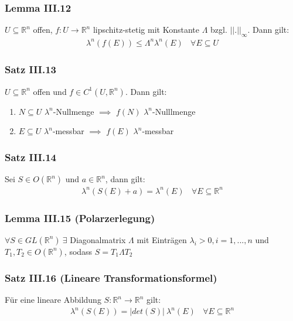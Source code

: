 \begin{frame}
\frametitle{Lemma III.12}
$U \subseteq \mathbb{R}^n$ offen, $f: U \to \mathbb{R}^n$ lipschitz-stetig mit Konstante $\Lambda$ bzgl. $||.||_{\infty}$. Dann gilt:
    \begin{align*}
      \lambda^n(f(E)) \leq \Lambda^n \lambda^n(E) \ \ \ \ \forall E \subseteq U
    \end{align*}
\end{frame}


\begin{frame}
\frametitle{Satz III.13}
$U \subseteq \mathbb{R}^n$ offen und $f \in C^1(U, \mathbb{R}^n)$. Dann gilt:
    \begin{enumerate}[label=\roman*)]
      \item $N \subseteq U$ $\lambda^n$-Nullmenge $\implies$ $f(N)$ $\lambda^n$-Nulllmenge
      \item $E \subseteq U$ $\lambda^n$-messbar $\implies$ $f(E)$ $\lambda^n$-messbar
    \end{enumerate}
\end{frame}


\begin{frame}
\frametitle{Satz III.14}
Sei $S \in O(\mathbb{R}^n)$ und $a \in \mathbb{R}^n$, dann gilt:
    \begin{align*}
      \lambda^n(S(E) + a) = \lambda^n(E) \ \ \ \ \forall E \subseteq \mathbb{R}^n
    \end{align*}
\end{frame}


\begin{frame}
\frametitle{Lemma III.15 (Polarzerlegung)}
$\forall S \in GL(\mathbb{R}^n) \ \exists$ Diagonalmatrix $\Lambda$ mit Einträgen $\lambda_i > 0, i=1,...,n$ und \\
    $T_1, T_2 \in O(\mathbb{R}^n)$, sodass $S = T_1 \Lambda T_2$ 
\end{frame}

\begin{frame}
\frametitle{Satz III.16 (Lineare Transformationsformel)}
Für eine lineare Abbildung $S: \mathbb{R}^n \to \mathbb{R}^n$ gilt:
    \begin{align*}
      \lambda^n(S(E)) = |det(S)| \ \lambda^n(E) \ \ \ \ \forall E \subseteq \mathbb{R}^n
    \end{align*}
\end{frame}

